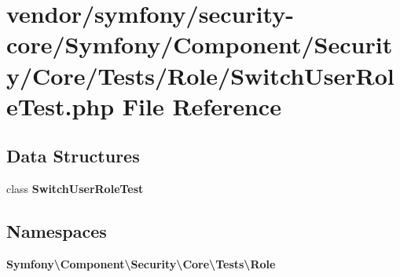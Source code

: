 \section{vendor/symfony/security-\/core/\+Symfony/\+Component/\+Security/\+Core/\+Tests/\+Role/\+Switch\+User\+Role\+Test.php File Reference}
\label{_switch_user_role_test_8php}
\subsection*{Data Structures}
\begin{DoxyCompactItemize}
\item 
class {\bf Switch\+User\+Role\+Test}
\end{DoxyCompactItemize}
\subsection*{Namespaces}
\begin{DoxyCompactItemize}
\item 
 {\bf Symfony\textbackslash{}\+Component\textbackslash{}\+Security\textbackslash{}\+Core\textbackslash{}\+Tests\textbackslash{}\+Role}
\end{DoxyCompactItemize}
